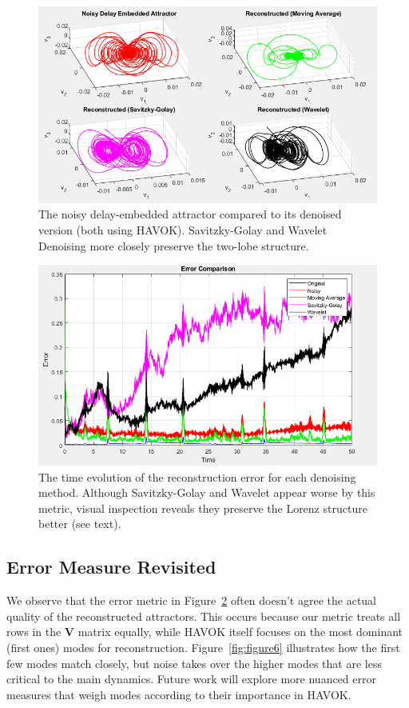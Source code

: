 \documentclass[11pt]{article}
\begin{document}
	\begin{figure}[htbp]
		\centering
		\includegraphics[width=0.7\linewidth]{Figure4}
		\caption{The noisy delay-embedded attractor compared to its denoised version (both using HAVOK). Savitzky-Golay and Wavelet Denoising more closely preserve the two-lobe structure.}
		\label{fig:figure4}
	\end{figure}
	
	\begin{figure}[htbp]
		\centering
		\includegraphics[width=0.7\linewidth]{Figure5}
		\caption{The time evolution of the reconstruction error for each denoising method. Although Savitzky-Golay and Wavelet appear worse by this metric, visual inspection reveals they preserve the Lorenz structure better (see text).}
		\label{fig:figure5}
	\end{figure}
	
	\subsection{Error Measure Revisited}
	We observe that the error metric in Figure~\ref{fig:figure5} often doesn't agree the actual quality of the reconstructed attractors. This occurs because our metric treats all rows in the \(\mathbf{V}\) matrix equally, while HAVOK itself focuses on the most dominant (first ones) modes for reconstruction. Figure~\ref{fig:figure6} illustrates how the first few modes match  closely, but noise takes over the higher modes that are less critical to the main dynamics. Future work will explore more nuanced error measures that weigh modes according to their importance in HAVOK.
	
\end{document}
